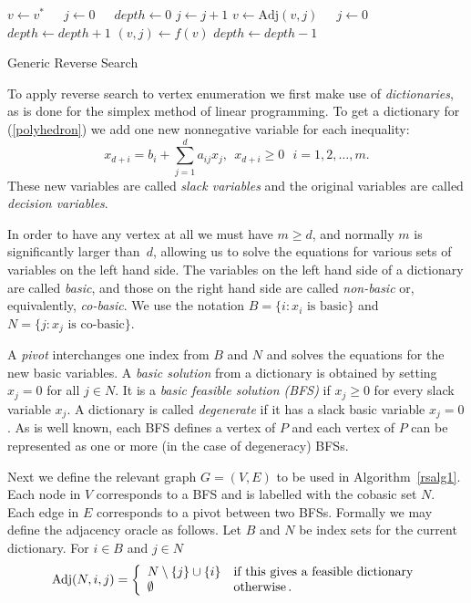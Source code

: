 \documentclass[a4paper,11pt]{article}   \usepackage{authblk} \usepackage[top=1.9cm,bottom=1.9cm,left=1.9cm,right=1.9cm]{geometry}
\newcommand{\Adj}{\textrm{Adj}}
\newcommand{\mydepth}{\ensuremath{\mathit{depth}}\xspace}
\begin{document}
\begin{algorithm}
\begin{algorithmic}[1]
\Procedure{rs}{$v^*$, $\Delta$, $\Adj$, $f$}
        \State $v \gets v^*$~~~$j \gets 0$~~~$\mydepth \gets 0 $
        \Repeat
                \State $j \gets j+1$
		\If {$f(\Adj(v,j)) = v$}  
			\State $v \gets \Adj(v,j)~~~~~$  
			\State $j \gets 0$ 
                        \State $\mydepth \gets \mydepth+1$         
                \EndIf
        \EndWhile
        \If {$\mydepth > 0$}                    
		\State $(v,j) \gets f(v)$
                \State $\mydepth \gets \mydepth-1  $       
        \EndIf
        \Until {$\mydepth=0$ {\bf and} $j=\Delta$}
\EndProcedure
\end{algorithmic}
\caption{Generic Reverse Search}
\label{rsalg1}
\end{algorithm}


To apply reverse search to vertex enumeration we first
make use of \emph{dictionaries}, as is done for the
simplex method of linear programming.
To get a dictionary for (\ref{polyhedron}) we
add one new nonnegative variable for each inequality:
\[
x_{d+i}=b_i+\sum_{j=1}^{d}{a_{ij}x_j}, ~~
x_{d+i}\geq 0~~~  i=1,2,\ldots,m.
\]
These new variables are called \emph{slack variables} and the
original variables are called
\emph{decision variables}.

In order to have any vertex at all we must
have $m\geq d$, and normally $m$ is significantly larger than~$d$,
allowing us to solve the equations for various sets of variables on
the left hand side.
The variables on the left hand side of a dictionary are called
\emph{basic}, and those on the right hand side are called \emph{non-basic}
or, equivalently, \emph{co-basic}.
We use the notation
$B=\{i:{x_i}\mbox{ is basic}\}$ and
$N=\{j:{x_j}\mbox{ is co-basic}\}$.

A \emph{pivot} interchanges one index from $B$ and $N$ and solves the equations
for the new basic variables.
A \emph{basic solution} from a dictionary is obtained by setting
$x_j=0$ for all $j\in N$.
It is a \emph{basic feasible solution (BFS)} if $x_j\geq 0$ for every slack
variable $x_{j}$. A dictionary is called
\emph{degenerate} if it has a slack basic variable $x_j=0$.
As is well known, each BFS defines a vertex of $P$ and each vertex of $P$ can
be represented as one or more (in the case of degeneracy) BFSs. 

Next we define the relevant graph $G=(V,E)$ to be used in Algorithm~\ref{rsalg1}.
Each node in $V$ corresponds to a BFS and is labelled with the cobasic set $N$.
Each edge in $E$ corresponds to a pivot between two BFSs. 
Formally we may define the adjacency
oracle as follows. Let $B$ and $N$ be index sets for the current dictionary.
For $i \in B$ and $j \in N$
\[
\Adj(N,i,j) =
  \left\{ \begin{array}{ll}
N  \setminus \{j\} \cup \{i\} & \mbox{if this gives a feasible dictionary}\\
\emptyset & \mbox{otherwise\,.} \\
 \end{array}\right.
\]
\end{document}
